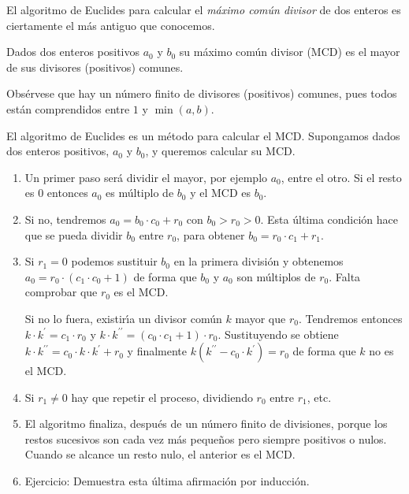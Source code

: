 El algoritmo de Euclides para calcular el {\itshape m\'aximo com\'un divisor} de
dos enteros es ciertamente el m\'as antiguo que conocemos.

Dados dos enteros positivos $a_0$ y $b_0$  su 
m\'aximo com\'un divisor (MCD) es el mayor de sus divisores (positivos)
comunes. 

Obsérvese que hay un número finito de divisores (positivos) comunes, pues todos
están 
comprendidos entre $1$ y $\min(a,b)$.


El algoritmo de Euclides es un m\'etodo para calcular el MCD. 
Supongamos dados dos enteros positivos, $a_0$ y $b_0$, y queremos 
calcular su MCD.

\begin{enumerate}
\item Un primer paso ser\'a dividir el mayor,  por ejemplo
$a_0$, entre el otro. Si el resto es $0$ entonces $a_0$ es 
m\'ultiplo de $b_0$  y el MCD es $b_0$.

\item Si no, tendremos
$ a_0 = b_0 \cdot c_0+r_0$  con $ b_0>r_0>0$.  Esta \'ultima condici\'on 
hace que se pueda dividir  $b_0$ entre $r_0$, para obtener $b_0=r_0 \cdot
c_1+r_1$.

\item Si $r_1=0$  podemos sustituir $b_0$ en la primera divisi\'on y obtenemos
$a_0=r_0 \cdot( c_1 \cdot c_0 +1)$ de forma que $ b_0$ y $a_0$ son m\'ultiplos
de $r_0$. Falta 
comprobar que $r_0$ es el MCD. 

Si no lo fuera, existir\'\i a un divisor com\'un $k$ mayor que $r_0$.
Tendremos entonces $k\cdot k ^\prime =c_1 \cdot r_0$ y 
$k\cdot k^{\prime \prime} =(c_0\cdot c_1+1) \cdot r_0$. Sustituyendo se obtiene
$k \cdot k^{\prime \prime} =c_0  \cdot k \cdot k ^\prime +r_0$ y finalmente
$k( k^{\prime \prime}-c_0 \cdot  k^\prime )=r_0$ de forma que $k$  no es el 
MCD.

\item Si $r_1 \ne 0$ hay que repetir el proceso, dividiendo $r_0$ entre 
$r_1$, etc.  

\item El algoritmo finaliza, despu\'es de un n\'umero finito de divisiones, 
porque los restos sucesivos son cada vez m\'as 
peque\~nos pero siempre positivos o nulos. Cuando se alcance un 
resto nulo, el anterior es el MCD.

\item {\sc Ejercicio}: Demuestra esta \'ultima afirmaci\'on  por inducci\'on.

\end{enumerate}


